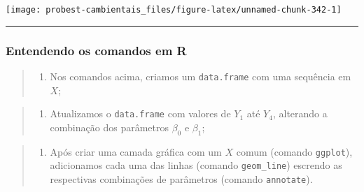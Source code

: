 \documentclass[
]{book}
\newenvironment{Shaded}{\begin{snugshade}}{\end{snugshade}}
\newcommand{\AttributeTok}[1]{\textcolor[rgb]{0.77,0.63,0.00}{#1}}
\newcommand{\DecValTok}[1]{\textcolor[rgb]{0.00,0.00,0.81}{#1}}
\newcommand{\FunctionTok}[1]{\textcolor[rgb]{0.00,0.00,0.00}{#1}}
\newcommand{\NormalTok}[1]{#1}
\newcommand{\SpecialCharTok}[1]{\textcolor[rgb]{0.00,0.00,0.00}{#1}}
\newcommand{\StringTok}[1]{\textcolor[rgb]{0.31,0.60,0.02}{#1}}
\providecommand{\tightlist}{%
  \setlength{\itemsep}{0pt}\setlength{\parskip}{0pt}}
\begin{document}
\begin{Shaded}
\end{Shaded}

\begin{center}\texttt{[image: probest-cambientais\_files/figure-latex/unnamed-chunk-342-1]} \end{center}

\begin{center}\rule{0.5\linewidth}{0.5pt}\end{center}

\hypertarget{entendendo-os-comandos-em-r}{%
\subsubsection*{Entendendo os comandos em R}\label{entendendo-os-comandos-em-r}}

\begin{quote}
\begin{enumerate}
\def\labelenumi{\arabic{enumi}.}
\tightlist
\item
  Nos comandos acima, criamos um \texttt{data.frame} com uma sequência em \(X\);
\end{enumerate}
\end{quote}

\begin{quote}
\begin{enumerate}
\def\labelenumi{\arabic{enumi}.}
\setcounter{enumi}{1}
\tightlist
\item
  Atualizamos o \texttt{data.frame} com valores de \(Y_1\) até \(Y_4\), alterando a combinação dos parâmetros \(\beta_0\) e \(\beta_1\);
\end{enumerate}
\end{quote}

\begin{quote}
\begin{enumerate}
\def\labelenumi{\arabic{enumi}.}
\setcounter{enumi}{2}
\tightlist
\item
  Após criar uma camada gráfica com um \(X\) comum (comando \texttt{ggplot}), adicionamos cada uma das linhas (comando \texttt{geom\_line}) escrendo as respectivas combinações de parâmetros (comando \texttt{annotate}).
\end{enumerate}
\end{quote}
\end{document}
